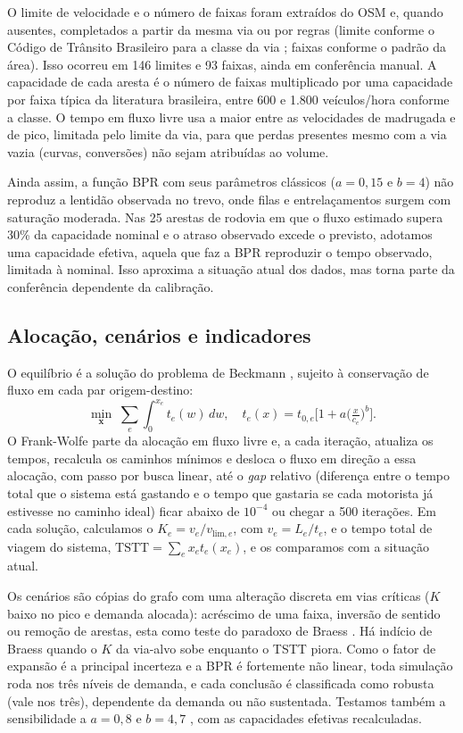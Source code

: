 \documentclass[portuguese]{sbc2025}%
\begin{document}
O limite de velocidade e o número de faixas foram extraídos do OSM e, quando ausentes, completados a partir da mesma via ou por regras (limite conforme o Código de Trânsito Brasileiro para a classe da via \cite{ctb2026}; faixas conforme o padrão da área). Isso ocorreu em 146 limites e 93 faixas, ainda em conferência manual. A capacidade de cada aresta é o número de faixas multiplicado por uma capacidade por faixa típica da literatura brasileira, entre 600 e 1.800 veículos/hora conforme a classe. O tempo em fluxo livre usa a maior entre as velocidades de madrugada e de pico, limitada pelo limite da via, para que perdas presentes mesmo com a via vazia (curvas, conversões) não sejam atribuídas ao volume.

Ainda assim, a função BPR \cite{bpr1964} com seus parâmetros clássicos ($a=0{,}15$ e $b=4$) não reproduz a lentidão observada no trevo, onde filas e entrelaçamentos surgem com saturação moderada. Nas 25 arestas de rodovia em que o fluxo estimado supera 30\% da capacidade nominal e o atraso observado excede o previsto, adotamos uma capacidade efetiva, aquela que faz a BPR reproduzir o tempo observado, limitada à nominal. Isso aproxima a situação atual dos dados, mas torna parte da conferência dependente da calibração.

\subsection{Alocação, cenários e indicadores}
O equilíbrio é a solução do problema de Beckmann \cite{beckmann1956}, sujeito à conservação de fluxo em cada par origem-destino:
\begin{equation}
\min_{\mathbf{x}}\; \sum_{e}\int_{0}^{x_e} t_e(w)\,dw,\quad t_e(x)=t_{0,e}\Big[1+a\Big(\tfrac{x}{c_e}\Big)^{b}\Big].
\label{eq:beckmann}
\end{equation}
O Frank-Wolfe \cite{frank1956} parte da alocação em fluxo livre e, a cada iteração, atualiza os tempos, recalcula os caminhos mínimos e desloca o fluxo em direção a essa alocação, com passo por busca linear, até o \textit{gap} relativo (diferença entre o tempo total que o sistema está gastando e o tempo que gastaria se cada motorista já estivesse no caminho ideal) ficar abaixo de $10^{-4}$ ou chegar a 500 iterações. Em cada solução, calculamos o $K_e=v_e/v_{\text{lim},e}$, com $v_e=L_e/t_e$, e o tempo total de viagem do sistema, $\text{TSTT}=\sum_e x_e t_e(x_e)$, e os comparamos com a situação atual.

Os cenários são cópias do grafo com uma alteração discreta em vias críticas ($K$ baixo no pico e demanda alocada): acréscimo de uma faixa, inversão de sentido ou remoção de arestas, esta como teste do paradoxo de Braess \cite{braess2005}. Há indício de Braess quando o $K$ da via-alvo sobe enquanto o TSTT piora. Como o fator de expansão é a principal incerteza e a BPR é fortemente não linear, toda simulação roda nos três níveis de demanda, e cada conclusão é classificada como robusta (vale nos três), dependente da demanda ou não sustentada. Testamos também a sensibilidade a $a=0{,}8$ e $b=4{,}7$ \cite{vdf2023}, com as capacidades efetivas recalculadas.
\end{document}
